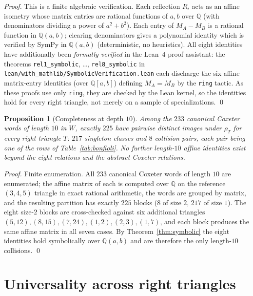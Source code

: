 \documentclass[11pt,a4paper]{article}
\newtheorem{proposition}[theorem]{Proposition}
\theoremstyle{remark}
\theoremstyle{plain}
\begin{document}
\begin{proof}
This is a finite algebraic verification.  Each reflection $R_i$ acts as
an affine isometry whose matrix entries are rational functions of
$a, b$ over $\mathbb{Q}$ (with denominators dividing a power of
$a^2 + b^2$).  Each entry of $M_A - M_B$ is a rational function in
$\mathbb{Q}(a, b)$; clearing denominators gives a polynomial identity
which is verified by SymPy in $\mathbb{Q}(a, b)$ (deterministic, no
heuristics).  All eight identities have additionally been
\emph{formally verified} in the Lean~4 proof assistant: the theorems
\texttt{rel1\_symbolic}, \dots, \texttt{rel8\_symbolic} in
\texttt{lean/with\_mathlib/SymbolicVerification.lean} each discharge the
six affine-matrix-entry identities (over $\mathbb{Q}[a,b]$) defining
$M_A = M_B$ by the \texttt{ring} tactic.  As these proofs use only
\texttt{ring}, they are checked by the Lean kernel, so the identities
hold for every right triangle, not merely on a sample of
specializations.
\qed
\end{proof}

\begin{proposition}[Completeness at depth $10$]
\label{prop:bonfioli-completeness}
Among the $233$ canonical Coxeter words of length $10$ in $W$, exactly
$225$ have pairwise distinct images under $\rho_T$ for every right
triangle $T$: $217$ singleton classes and $8$ collision pairs, each
pair being one of the rows of Table~\ref{tab:bonfioli}.  No further
length-$10$ affine identities exist beyond the eight relations and the
abstract Coxeter relations.
\end{proposition}

\begin{proof}
Finite enumeration.  All $233$ canonical Coxeter words of length $10$
are enumerated; the affine matrix of each is computed over $\mathbb{Q}$
on the reference $(3, 4, 5)$ triangle in exact rational arithmetic, the
words are grouped by matrix, and the resulting partition has exactly
$225$ blocks ($8$ of size $2$, $217$ of size $1$).  The eight size-$2$
blocks are cross-checked against six additional triangles
$(5, 12), (8, 15), (7, 24), (1, 2), (2, 3), (1, 7)$, and each block
produces the same affine matrix in all seven cases.  By
Theorem~\ref{thm:symbolic} the eight identities hold symbolically over
$\mathbb{Q}(a, b)$ and are therefore the only length-$10$ collisions.
\qed
\end{proof}

\section{Universality across right triangles}
\label{sec:univ}
\end{document}
